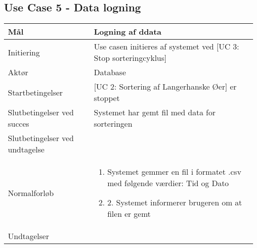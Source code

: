 \subsection{Use Case 5 - Data logning}
\begin{center}
		\begin{longtable}{ | m{4cm} | m{8cm}| } 
			\hline
			Mål & Logning af ddata \\ 
			\hline
			Initiering &  Use casen initieres af systemet ved [UC 3: Stop sorteringcyklus]\\
			\hline
			Aktør & Database \\ 
			\hline
			Startbetingelser & [UC 2: Sortering af Langerhanske Øer] er stoppet \\
			\hline	
			Slutbetingelser ved succes & Systemet har gemt fil med data for sorteringen \\
			\hline
			Slutbetingelser ved undtagelse &  \\
			\hline
			Normalforløb & \begin{enumerate}
				\setlength\itemsep{0cm} %
				\item Systemet gemmer en fil i formatet .csv med følgende værdier:
				\subitem Tid og Dato
				\item 2.	Systemet informerer brugeren om at filen er gemt
			\end{enumerate} \\ 
			\hline
			Undtagelser & \\
			\hline
		\end{longtable}
		
	\end{center}
	\pagebreak